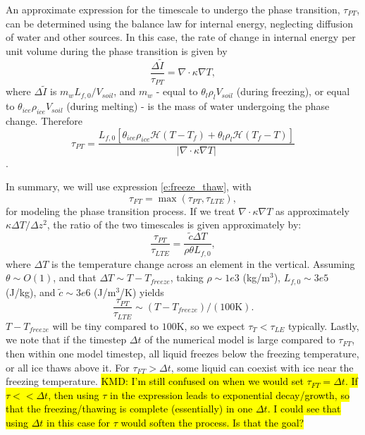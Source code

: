 \documentclass[twoside,10pt]{report}
\begin{document}
An approximate expression for the timescale to undergo the phase transition, $\tau_{PT}$, can be determined using the balance law for internal energy, neglecting diffusion of water and other sources. In this case, the rate of change in internal energy per unit volume during the phase transition is given by 
\begin{equation}\label{e:idot_during_pt}
    \frac{\Delta \tilde{I}}{\tau_{PT}} = \nabla \cdot \kappa \nabla T,
\end{equation}
where $\Delta \tilde{I}$ is $m_w L_{f,0}/V_{soil}$, and $m_w$ - equal to $\theta_l \rho_l V_{soil}$ (during freezing), or equal to $\theta_{ice} \rho_{ice} V_{soil}$ (during melting) - is the mass of water undergoing the phase change. Therefore
\begin{equation}\label{e:pt_tau}
    \tau_{PT} = \frac{L_{f,0}[\theta_{ice} \rho_{ice}\mathcal{H}(T - T_f) + \theta_{l} \rho_{l}\mathcal{H}(T_f - T)]}{|\nabla \cdot \kappa \nabla T|}
\end{equation}.

In summary, we will use expression \eqref{e:freeze_thaw}, with 
\begin{equation}
    \tau_{FT} = \max\left(\tau_{PT}, \tau_{LTE} \right),
\end{equation}
for modeling the phase transition process. If we treat $\nabla \cdot \kappa \nabla T$ as approximately $\kappa \Delta T/\Delta z^2$, the ratio of the two timescales is given approximately by:
\begin{equation}
    \frac{\tau_{PT}}{\tau_{LTE}} = \frac{\tilde{c} \Delta T}{\rho \theta L_{f,0} },
\end{equation}
where $\Delta T$ is the temperature change across an element in the vertical. Assuming $\theta \sim O(1)$, and that $\Delta T \sim T-T_{freeze}$, taking $\rho \sim 1e3$ (kg/m$^3$), $L_{f,0} \sim 3e5$ (J/kg), and $\tilde{c}\sim 3e6$ (J/m$^3$/K) yields 
\begin{equation}
    \frac{\tau_{PT}}{\tau_{LTE}} \sim (T-T_{freeze})/(100 \mbox{K}).
\end{equation}
$T-T_{freeze}$ will be tiny compared to $100$K, so we expect $\tau_T<\tau_{LE}$ typically. Lastly, we note that if the timestep $\Delta t$ of the numerical model is large compared to $\tau_{FT}$, then within one model timestep, all liquid freezes below the freezing temperature, or all ice thaws above it. For $\tau_{FT} > \Delta t$, some liquid can coexist with ice near the freezing temperature. \hl{KMD: I'm still confused on when we would set $\tau_{FT} = \Delta t$. If $\tau<<\Delta t$, then using $\tau$ in the expression leads to exponential decay/growth, so that the freezing/thawing is complete (essentially) in one $\Delta t$. I could see that using $\Delta t$ in this case for $\tau$ would soften the process. Is that the goal?}
\end{document}
